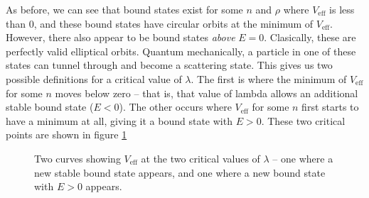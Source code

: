 \documentclass[12pt,twoside]{reedthesis}
\begin{document}
As before, we can see that bound states exist for some $n$ and $\rho$ where $V_{\mathrm{eff}}$ is less than 0, and these bound states have circular orbits at the minimum of $V_{\mathrm{eff}}$. However, there also appear to be bound states \emph{above} $E = 0$. Clasically, these are perfectly valid elliptical orbits. Quantum mechanically, a particle in one of these states can tunnel through and become a scattering state. This gives us two possible definitions for a critical value of $\lambda$.  The first is where the minimum of $V_{\mathrm{eff}}$ for some $n$ moves below zero -- that is, that value of lambda allows an additional stable bound state ($E < 0$). The other occurs where $V_{\mathrm{eff}}$ for some $n$ first starts to have a minimum at all, giving it a bound state with $E>0$. These two critical points are shown in figure \ref{fig:critpoints}

\begin{figure}[h]
\caption[The two critical values of $\lambda$]{Two curves showing $V_{\mathrm{eff}}$ at the two critical values of $\lambda$ -- one where a new stable bound state appears, and one where a new bound state with $E > 0$ appears.}
\label{fig:critpoints}
\end{figure}
\end{document}
